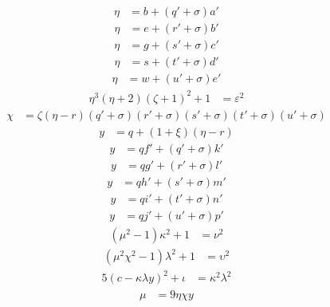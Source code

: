 \documentclass[11pt,a4paper]{article}
\begin{document}
\begin{align}
\eta&=b+(q'+\sigma)a' \tag{1.3.13}\label{sys:13}
\end{align}
\begin{align}
\eta&=e+(r'+\sigma)b' \tag{1.3.14}\label{sys:14}
\end{align}
\begin{align}
\eta&=g+(s'+\sigma)c' \tag{1.3.15}\label{sys:15}
\end{align}
\begin{align}
\eta&=s+(t'+\sigma)d' \tag{1.3.16}\label{sys:16}
\end{align}
\begin{align}
\eta&=w+(u'+\sigma)e' \tag{1.3.17}\label{sys:17}
\end{align}
\begin{align}
\eta^3(\eta+2)(\zeta+1)^2+1&=\varepsilon^2 \tag{1.3.18}\label{sys:18}
\end{align}
\begin{align}
\chi&=\zeta(\eta-r)(q'+\sigma)(r'+\sigma)(s'+\sigma)(t'+\sigma)(u'+\sigma) \tag{1.3.19}\label{sys:19}
\end{align}
\begin{align}
y&=q+(1+\xi)(\eta-r) \tag{1.3.20}\label{sys:20}
\end{align}
\begin{align}
y&=qf'+(q'+\sigma)k' \tag{1.3.21}\label{sys:21}
\end{align}
\begin{align}
y&=qg'+(r'+\sigma)l' \tag{1.3.22}\label{sys:22}
\end{align}
\begin{align}
y&=qh'+(s'+\sigma)m' \tag{1.3.23}\label{sys:23}
\end{align}
\begin{align}
y&=qi'+(t'+\sigma)n' \tag{1.3.24}\label{sys:24}
\end{align}
\begin{align}
y&=qj'+(u'+\sigma)p' \tag{1.3.25}\label{sys:25}
\end{align}
\begin{align}
(\mu^2-1)\kappa^2+1&=\nu^2 \tag{1.3.26}\label{sys:26}
\end{align}
\begin{align}
(\mu^2\chi^2-1)\lambda^2+1&=\upsilon^2 \tag{1.3.27}\label{sys:27}
\end{align}
\begin{align}
5(c-\kappa\lambda y)^2+\iota&=\kappa^2\lambda^2 \tag{1.3.28}\label{sys:28}
\end{align}
\begin{align}
\mu&=9\eta\chi y \tag{1.3.29}\label{sys:29}
\end{align}
\end{document}
